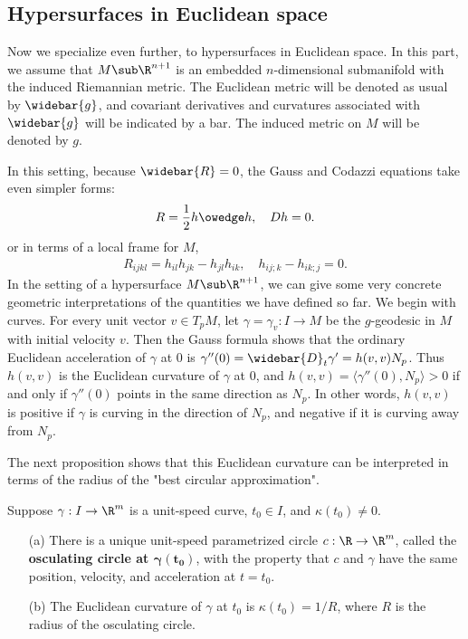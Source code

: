 \subsection{Hypersurfaces in Euclidean space}
Now we specialize even further, to hypersurfaces in Euclidean space. In this part, we assume that $M\sub\R^{n+1}$ is an embedded $n$-dimensional submanifold with the 
induced Riemannian metric. The Euclidean metric will be denoted as usual by $\widebar{g}$, and covariant derivatives and curvatures associated with $\widebar{g}$ will 
be indicated by a bar. The induced metric on $M$ will be denoted by $g$.\par
In this setting, because $\widebar{R}=0$, the Gauss and Codazzi equations take even simpler forms:
\begin{align}\label{Riemann Euclidean Guass Codazzi-1}
R=\frac{1}{2}h\owedge h,\quad Dh=0.
\end{align}
or in terms of a local frame for $M$,
\begin{align}\label{Riemann Euclidean Guass Codazzi-2}
R_{ijkl}=h_{il}h_{jk}-h_{jl}h_{ik},\quad h_{ij;k}-h_{ik;j}=0.
\end{align}
In the setting of a hypersurface $M\sub\R^{n+1}$, we can give some very concrete geometric interpretations of the quantities we have defined so far. We begin with curves. 
For every unit vector $v\in T_pM$, let $\gamma=\gamma_v:I\to M$ be the $g$-geodesic in $M$ with initial velocity $v$. Then the Gauss formula shows that the ordinary 
Euclidean acceleration of $\gamma$ at $0$ is $\gamma''(0)=\widebar{D}_t\gamma'=h(v,v)N_p$. Thus $h(v,v)$ is the Euclidean curvature of $\gamma$ at $0$, and $h(v,v)=\langle\gamma''(0),N_p\rangle>0$ 
if and only if $\gamma''(0)$ points in the same direction as $N_p$. In other words, $h(v,v)$ is positive if $\gamma$ is curving in the direction of $N_p$, and negative 
if it is curving away from $N_p$.\par
The next proposition shows that this Euclidean curvature can be interpreted in terms of the radius of the "best circular approximation".
\begin{proposition}
Suppose $\gamma:I\to\R^m$ is a unit-speed curve, $t_0\in I$, and $\kappa(t_0)\neq 0$.
\begin{itemize}
\item[(a)] There is a unique unit-speed parametrized circle $c:\R\to\R^m$, called the \textbf{osculating circle at $\bm{\gamma(t_0)}$}, with the property that $c$ and 
$\gamma$ have the same position, velocity, and acceleration at $t=t_0$.
\item[(b)] The Euclidean curvature of $\gamma$ at $t_0$ is $\kappa(t_0)=1/R$, where $R$ is the radius of the osculating circle.
\end{itemize}
\end{proposition}
